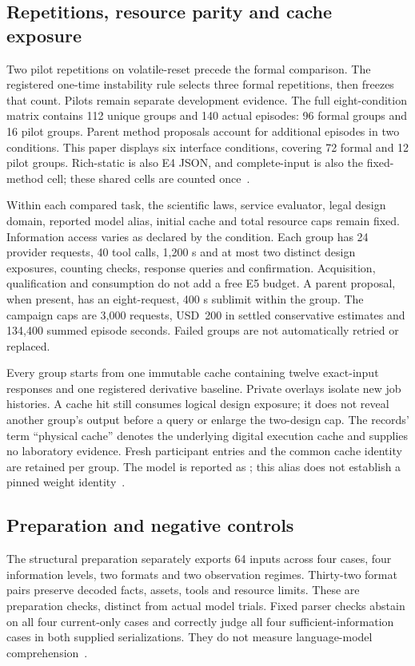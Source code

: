 \subsection{Repetitions, resource parity and cache exposure}
Two pilot repetitions on volatile-reset precede the formal comparison.
The registered one-time instability rule selects three formal repetitions,
then freezes that count. Pilots remain separate development evidence.
The full eight-condition matrix contains 112 unique groups and 140 actual
episodes: 96 formal groups and 16 pilot groups. Parent method proposals
account for additional episodes in two conditions. This paper displays
six interface conditions, covering 72 formal and 12 pilot groups. Rich-static
is also E4 JSON, and complete-input is also the fixed-method cell; these
shared cells are counted once~\cite{protocol,comparison}.

Within each compared task, the scientific laws, service evaluator, legal
design domain, reported model alias, initial cache and total resource caps
remain fixed. Information access varies as declared by the condition.
Each group has 24 provider requests, 40 tool calls, 1,200 s and at most
two distinct design exposures, counting checks, response queries and
confirmation. Acquisition, qualification and consumption do not add a
free E5 budget. A parent proposal, when present, has an eight-request,
400 s sublimit within the group. The campaign caps are 3,000 requests,
USD~200 in settled conservative estimates and 134,400 summed episode
seconds. Failed groups are not automatically retried or replaced.

Every group starts from one immutable cache containing twelve exact-input
responses and one registered derivative baseline. Private overlays isolate
new job histories. A cache hit still consumes logical design exposure;
it does not reveal another group's output before a query or enlarge the
two-design cap. The records' term ``physical cache'' denotes the underlying
digital execution cache and supplies no laboratory evidence. Fresh
participant entries and the common cache identity are retained per group.
The model is reported as ; this alias does not establish
a pinned weight identity~\cite{comparison}.

\subsection{Preparation and negative controls}
The structural preparation separately exports 64 inputs across four cases,
four information levels, two formats and two observation regimes. Thirty-two
format pairs preserve decoded facts, assets, tools and resource limits.
These are preparation checks, distinct from actual model trials. Fixed
parser checks abstain on all four current-only cases and correctly judge
all four sufficient-information cases in both supplied serializations.
They do not measure language-model comprehension~\cite{structural,contract}.

